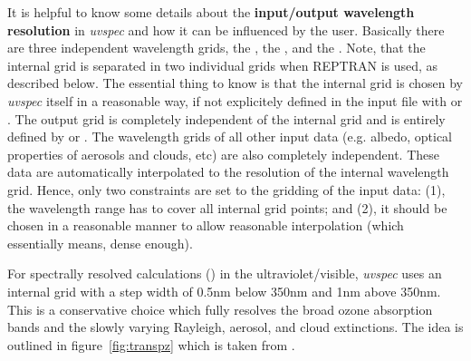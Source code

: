 It is helpful to know some details about the {\bf input/output
wavelength resolution} in {\sl uvspec} and how it can be influenced
by the user. Basically there are three independent wavelength grids,
the , the , and the
. Note, that the internal grid is separated in 
two individual grids when REPTRAN is used, as described below.
The essential thing to know is that the internal
grid is chosen by {\sl uvspec} itself in a reasonable way, if not
explicitely defined in the input file with
 or . The
output grid is completely independent of the internal grid and is
entirely defined by  or . 
The wavelength grids of all
other input data (e.g. albedo, optical properties of aerosols and
clouds, etc) are also completely independent. These data are
automatically interpolated to the resolution of the internal
wavelength grid. Hence, only two constraints are set to the gridding
of the input data: (1), the wavelength range has to cover all internal
grid points; and (2), it should be chosen in a reasonable manner to
allow reasonable interpolation (which essentially means, dense
enough).

For spectrally resolved calculations () in the ultraviolet/visible, 
  {\sl uvspec} uses an internal grid with a
step width of 0.5nm below 350nm and 1nm above 350nm. This is a
conservative choice which fully resolves the broad ozone absorption
bands and the slowly varying Rayleigh, aerosol, and cloud
extinctions. The idea is outlined in figure~\ref{fig:transpz} which is
taken from \citet{Mayer1997}.

